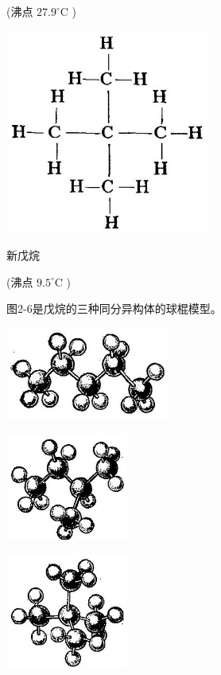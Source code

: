 \documentclass[10pt]{article}
\begin{document}
(沸点 \({27.9}^{ \circ }\mathrm{C}\) )

\begin{center}
\includegraphics[max width=0.5\textwidth]{images/01912d16-be99-77bb-9535-4f3ed8d9946f_63_741174.jpg}
\end{center}

新戊烷

(沸点 \({9.5}^{ \circ }\mathrm{C}\) )

图2-6是戊烷的三种同分异构体的球棍模型。

\begin{center}
\includegraphics[max width=0.4\textwidth]{images/01912d16-be99-77bb-9535-4f3ed8d9946f_63_161589.jpg}
\end{center}

\begin{center}
\includegraphics[max width=0.3\textwidth]{images/01912d16-be99-77bb-9535-4f3ed8d9946f_63_353976.jpg}
\end{center}

\begin{center}
\includegraphics[max width=0.3\textwidth]{images/01912d16-be99-77bb-9535-4f3ed8d9946f_63_353804.jpg}
\end{center}
\end{document}
